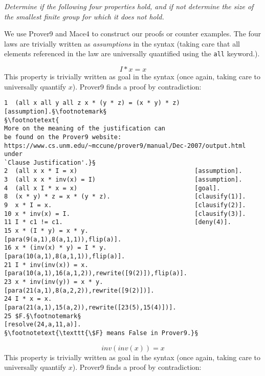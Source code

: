\documentclass[12pt]{article}
\begin{document}
\textit{Determine if the following four properties hold, and if not 
determine the size of the smallest finite group for which it does not hold.}

\vspace{3mm}

We use Prover9 and Mace4 to construct our proofs or counter examples. The four
laws are trivially written as \emph{assumptions} in the syntax (taking care
that all elements referenced in the law are universally quantified using the 
\texttt{all} keyword.).

\vspace{3mm}

\begin{equation*}
    I * x = x
\end{equation*}
This property is trivially written as goal in the syntax (once again, taking 
care to universally quantify $x$). Prover9 finds a proof by contradiction: 

\begin{lstlisting}
1  (all x all y all z x * (y * z) = (x * y) * z)    [assumption].§\footnotemark§ 
§\footnotetext{
More on the meaning of the justification can 
be found on the Prover9 website: 
https://www.cs.unm.edu/~mccune/prover9/manual/Dec-2007/output.html under 
`Clause Justification'.}§
2  (all x x * I = x)                                [assumption].
3  (all x x * inv(x) = I)                           [assumption].
4  (all x I * x = x)                                [goal].
8  (x * y) * z = x * (y * z).                       [clausify(1)].
9  x * I = x.                                       [clausify(2)].
10 x * inv(x) = I.                                  [clausify(3)].
11 I * c1 != c1.                                    [deny(4)].
15 x * (I * y) = x * y.                             [para(9(a,1),8(a,1,1)),flip(a)].
16 x * (inv(x) * y) = I * y.                        [para(10(a,1),8(a,1,1)),flip(a)].
21 I * inv(inv(x)) = x.                             [para(10(a,1),16(a,1,2)),rewrite([9(2)]),flip(a)].
23 x * inv(inv(y)) = x * y.                         [para(21(a,1),8(a,2,2)),rewrite([9(2)])].
24 I * x = x.                                       [para(21(a,1),15(a,2)),rewrite([23(5),15(4)])].
25 $F.§\footnotemark§                                              [resolve(24,a,11,a)].
§\footnotetext{\texttt{\$F} means False in Prover9.}§
\end{lstlisting}

\vspace{3mm}

\begin{equation*}
    inv(inv(x)) = x
\end{equation*}
This property is trivially written as goal in the syntax (once again, taking 
care to universally quantify $x$). Prover9 finds a proof by contradiction: 
\end{document}
